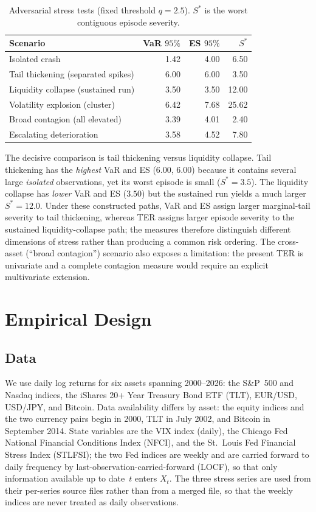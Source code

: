 \documentclass[11pt]{article}
\begin{document}
\begin{table}[t]
\centering
\caption{Adversarial stress tests (fixed threshold $q=2.5$). $S^{*}$ is the worst contiguous
episode severity.}
\label{tab:stress}
\begin{tabular}{lrrr}
\toprule
Scenario & VaR $95\%$ & ES $95\%$ & $S^{*}$ \\
\midrule
Isolated crash                       & 1.42 & 4.00 & 6.50 \\
Tail thickening (separated spikes)   & 6.00 & 6.00 & 3.50 \\
Liquidity collapse (sustained run)   & 3.50 & 3.50 & 12.00 \\
Volatility explosion (cluster)       & 6.42 & 7.68 & 25.62 \\
Broad contagion (all elevated)       & 3.39 & 4.01 & 2.40 \\
Escalating deterioration             & 3.58 & 4.52 & 7.80 \\
\bottomrule
\end{tabular}
\end{table}

The decisive comparison is tail thickening versus liquidity collapse. Tail thickening has the
\emph{highest} VaR and ES ($6.00$, $6.00$) because it contains several large \emph{isolated} observations,
yet its worst episode is small ($S^{*}=3.5$). The liquidity collapse has \emph{lower} VaR and ES ($3.50$)
but the sustained run yields a much larger $S^{*}=12.0$. Under these constructed paths, VaR and ES assign
larger marginal-tail severity to tail thickening, whereas TER assigns larger episode severity to the
sustained liquidity-collapse path; the measures therefore distinguish different dimensions of stress rather
than producing a common risk ordering. The cross-asset (``broad contagion'') scenario also exposes a
limitation: the present TER is univariate and a
complete contagion measure would require an explicit multivariate extension.

\section{Empirical Design}\label{sec:design}

\subsection{Data}
We use daily log returns for six assets spanning 2000--2026: the S\&P~500 and Nasdaq indices, the iShares
20+ Year Treasury Bond ETF (TLT), EUR/USD, USD/JPY, and Bitcoin. Data availability differs by asset: the
equity indices and the two currency pairs begin in 2000, TLT in July 2002, and Bitcoin in September 2014.
State variables are the VIX index (daily), the Chicago Fed National Financial Conditions Index (NFCI), and
the St.\ Louis Fed Financial Stress Index (STLFSI); the two Fed indices are weekly and are carried forward
to daily frequency by last-observation-carried-forward (LOCF), so that only information available up to
date~$t$ enters $X_t$. The three stress series are used from their per-series source files rather than from
a merged file, so that the weekly indices are never treated as daily observations.
\end{document}
